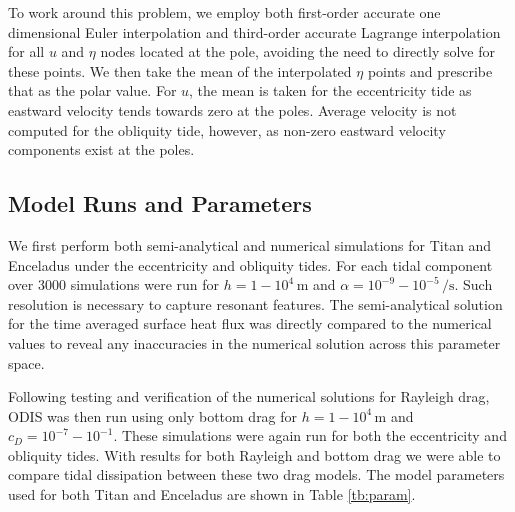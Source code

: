 To work around this problem, we employ both first-order accurate one dimensional Euler interpolation and third-order accurate Lagrange interpolation for all $u$ and $\eta$ nodes located at the pole, avoiding the need to directly solve for these points. We then take the mean of the interpolated $\eta$ points and prescribe that as the polar value. For $u$, the mean is taken for the eccentricity tide as eastward velocity tends towards zero at the poles. Average velocity is not computed for the obliquity tide, however, as non-zero eastward velocity components exist at the poles.

\subsection{Model Runs and Parameters \label{subsec:param}}




We first perform both semi-analytical and numerical simulations for Titan and Enceladus under the eccentricity and obliquity tides. For each tidal component over 3000 simulations were run for \hbox{$h = 1 - 10^4 \, \si{\metre}$} and \hbox{$\alpha = 10^{-9} - 10^{-5} \, \si{\per\second}$}. Such resolution is necessary to capture resonant features. The semi-analytical solution for the time averaged surface heat flux was directly compared to the numerical values to reveal any inaccuracies in the numerical solution across this parameter space. 

Following testing and verification of the numerical solutions for Rayleigh drag, ODIS was then run using only bottom drag for \hbox{$h = 1 - 10^4 \, \si{\metre}$} and \hbox{$c_D = 10^{-7} - 10^{-1}$}. These simulations were again run for both the eccentricity and obliquity tides. With results for both Rayleigh and bottom drag we were able to compare tidal dissipation between these two drag models. The model parameters used for both Titan and Enceladus are shown in Table \ref{tb:param}.

